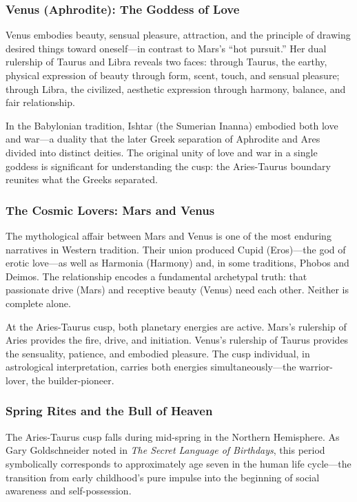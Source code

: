 \documentclass[11pt,letterpaper]{article}
\begin{document}
\subsubsection{Venus (Aphrodite): The Goddess of Love}

Venus embodies beauty, sensual pleasure, attraction, and the principle of drawing desired things toward oneself---in contrast to Mars's ``hot pursuit.'' Her dual rulership of Taurus and Libra reveals two faces: through Taurus, the earthy, physical expression of beauty through form, scent, touch, and sensual pleasure; through Libra, the civilized, aesthetic expression through harmony, balance, and fair relationship.

In the Babylonian tradition, Ishtar (the Sumerian Inanna) embodied both love and war---a duality that the later Greek separation of Aphrodite and Ares divided into distinct deities. The original unity of love and war in a single goddess is significant for understanding the cusp: the Aries-Taurus boundary reunites what the Greeks separated.

\subsubsection{The Cosmic Lovers: Mars and Venus}

The mythological affair between Mars and Venus is one of the most enduring narratives in Western tradition. Their union produced Cupid (Eros)---the god of erotic love---as well as Harmonia (Harmony) and, in some traditions, Phobos and Deimos. The relationship encodes a fundamental archetypal truth: that passionate drive (Mars) and receptive beauty (Venus) need each other. Neither is complete alone.

At the Aries-Taurus cusp, both planetary energies are active. Mars's rulership of Aries provides the fire, drive, and initiation. Venus's rulership of Taurus provides the sensuality, patience, and embodied pleasure. The cusp individual, in astrological interpretation, carries both energies simultaneously---the warrior-lover, the builder-pioneer.

\subsubsection{Spring Rites and the Bull of Heaven}

The Aries-Taurus cusp falls during mid-spring in the Northern Hemisphere. As Gary Goldschneider noted in \textit{The Secret Language of Birthdays}, this period symbolically corresponds to approximately age seven in the human life cycle---the transition from early childhood's pure impulse into the beginning of social awareness and self-possession.
\end{document}
